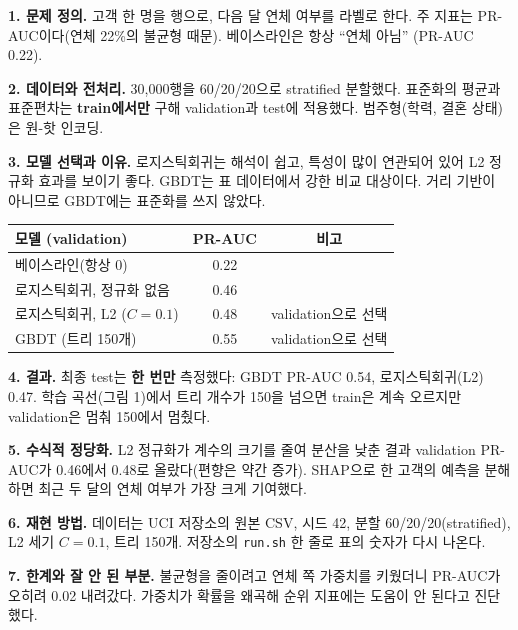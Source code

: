 \documentclass[11pt]{article}
\begin{document}


\noindent\textbf{1. 문제 정의.} 고객 한 명을 행으로, 다음 달 연체 여부를 라벨로 한다. 주 지표는 PR-AUC이다(연체 22\%의 불균형 때문). 베이스라인은 항상 ``연체 아님'' (PR-AUC 0.22).

\noindent\textbf{2. 데이터와 전처리.} 30{,}000행을 60/20/20으로 stratified 분할했다. 표준화의 평균과 표준편차는 \textbf{train에서만} 구해 validation과 test에 적용했다. 범주형(학력, 결혼 상태)은 원-핫 인코딩.

\noindent\textbf{3. 모델 선택과 이유.} 로지스틱회귀는 해석이 쉽고, 특성이 많이 연관되어 있어 L2 정규화 효과를 보이기 좋다. GBDT는 표 데이터에서 강한 비교 대상이다. 거리 기반이 아니므로 GBDT에는 표준화를 쓰지 않았다.

\begin{center}\small
\begin{tabular}{@{}lcc@{}}\toprule
모델 (validation) & PR-AUC & 비고 \\\midrule
베이스라인(항상 0) & 0.22 & \\
로지스틱회귀, 정규화 없음 & 0.46 & \\
로지스틱회귀, L2 ($C=0.1$) & 0.48 & validation으로 선택 \\
GBDT (트리 150개) & 0.55 & validation으로 선택 \\\bottomrule
\end{tabular}
\end{center}

\noindent\textbf{4. 결과.} 최종 test는 \textbf{한 번만} 측정했다: GBDT PR-AUC 0.54, 로지스틱회귀(L2) 0.47. 학습 곡선(그림 1)에서 트리 개수가 150을 넘으면 train은 계속 오르지만 validation은 멈춰 150에서 멈췄다.

\noindent\textbf{5. 수식적 정당화.} L2 정규화가 계수의 크기를 줄여 분산을 낮춘 결과 validation PR-AUC가 0.46에서 0.48로 올랐다(편향은 약간 증가). SHAP으로 한 고객의 예측을 분해하면 최근 두 달의 연체 여부가 가장 크게 기여했다.

\noindent\textbf{6. 재현 방법.} 데이터는 UCI 저장소의 원본 CSV, 시드 42, 분할 60/20/20(stratified), L2 세기 $C=0.1$, 트리 150개. 저장소의 \texttt{run.sh} 한 줄로 표의 숫자가 다시 나온다.

\noindent\textbf{7. 한계와 잘 안 된 부분.} 불균형을 줄이려고 연체 쪽 가중치를 키웠더니 PR-AUC가 오히려 0.02 내려갔다. 가중치가 확률을 왜곡해 순위 지표에는 도움이 안 된다고 진단했다.
\end{document}
